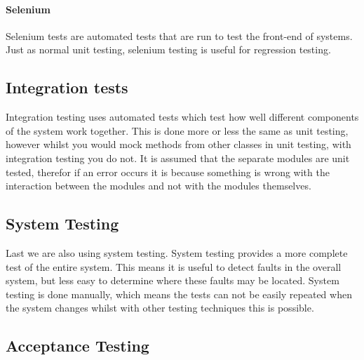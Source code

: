 \paragraph{Selenium}
Selenium tests are automated tests that are run to test the front-end of systems. Just as normal unit testing, selenium testing is useful for regression testing.

\subsection{Integration tests}
Integration testing uses automated tests which test how well different components of the system work together. This is done more or less the same as unit testing, however whilst you would mock methods from other classes in unit testing, with integration testing you do not. It is assumed that the separate modules are unit tested, therefor if an error occurs it is because something is wrong with the interaction between the modules and not with the modules themselves. 

\subsection{System Testing}
Last we are also using system testing. System testing provides a more complete test of the entire system. This means it is useful to detect faults in the overall system, but less easy to determine where these faults may be located. System testing is done manually, which means the tests can not be easily repeated when the system changes whilst with other testing techniques this is possible. 

\subsection{Acceptance Testing}
